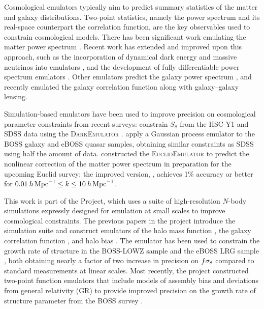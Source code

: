 Cosmological emulators typically aim to predict summary statistics of the matter and galaxy distributions.
Two-point statistics, namely the power spectrum and its real-space counterpart the correlation function, are the key observables used to constrain cosmological models.
There has been significant work emulating the matter power spectrum \citep{Heitmann2009, Lawrence2017, Giblin2019, Ho2022}.
Recent work has extended and improved upon this approach, such as the incorporation of dynamical dark energy and massive neutrinos into emulators \citep{Angulo2021}, and the development of fully differentiable power spectrum emulators \citep{SpurioMancini2022, derose_neural_2022}.
Other emulators predict the galaxy power spectrum \citep{Kwan2015, Pellejero-Ibanez2020, kokron_cosmology_2021}, and \cite{Wibking2019} recently emulated the galaxy correlation function along with galaxy--galaxy lensing.

Simulation-based emulators have been used to improve precision on cosmological parameter constraints from recent surveys:
\cite{Miyatake2021} constrain $S_8$ from the HSC-Y1 and SDSS data using the \textsc{DarkEmulator} \citep{Nishimichi2019}.
\cite{Neveux2022} apply a Gaussian process emulator to the BOSS galaxy and eBOSS quasar samples, obtaining similar constraints as SDSS using half the amount of data.
\cite{EuclidPrepII} constructed the \textsc{EuclidEmulator} to predict the nonlinear correction of the matter power spectrum in preparation for the upcoming Euclid survey; the improved version, \cite{EuclidPrepIX}, achieves 1\% accuracy or better for $0.01 \: h\,\mathrm{Mpc}^{-1} \leq k \leq 10 \: h\,\mathrm{Mpc}^{-1}$.

This work is part of the \aemulus Project, which uses a suite of high-resolution $N$-body simulations expressly designed for emulation at small scales to improve cosmological constraints.
The previous papers in the project introduce the simulation suite \citep{DeRose2018} and construct emulators of the halo mass function \citep{McClintock2018}, the galaxy correlation function \citep{Zhai2019}, and halo bias \citep{McClintock2019}.
The \aemulus emulator has been used to constrain the growth rate of structure in the BOSS-LOWZ sample \citep{Lange2022} and the eBOSS LRG sample \citep{Chapman2021}, both obtaining nearly a factor of two increase in precision on $f\sigma_8 $ compared to standard measurements at linear scales.
Most recently, the \aemulus project constructed two-point function emulators that include models of assembly bias and deviations from general relativity (GR) to provide improved precision on the growth rate of structure parameter from the BOSS survey \citep{Zhai2022}.

